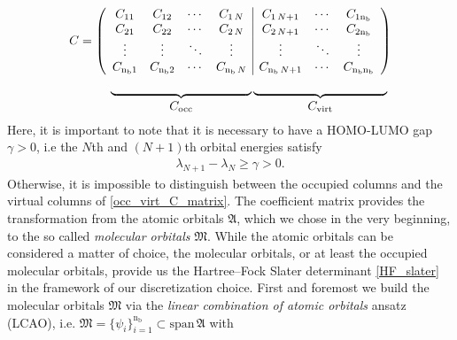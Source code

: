 \documentclass[reqno]{amsart}
\begin{document}
\begin{align}\label{occ_virt_C_matrix}
C = \left(
\begin{array}{cccc|ccc}
C_{11} & C_{12} & \cdots & C_{1\,N} & C_{1\,N+1} & \cdots & C_{1\text{n}_{\text{b}}} \\
C_{21} & C_{22} & \cdots & C_{2\,N} & C_{2\,N+1} & \cdots & C_{2\text{n}_{\text{b}}} \\
\vdots & \vdots & \ddots & \vdots & \vdots & \ddots & \vdots \\
C_{\text{n}_{\text{b}} 1} & C_{\text{n}_{\text{b}} 2} & \cdots & C_{\text{n}_{\text{b}}\,N} & C_{\text{n}_{\text{b}}\,N+1} & \cdots & C_{\text{n}_{\text{b}} \text{n}_{\text{b}}}
\end{array}
\right)
\nonumber \\
\underbrace{\hspace{4cm}}_{\displaystyle C_\mathrm{occ}}
\underbrace{\hspace{3.8cm}}_{\displaystyle C_\mathrm{virt}}\,\,
\end{align}
Here, it is important to note that it is necessary to have a HOMO-LUMO gap $\gamma>0$, i.e the $N$th and $(N+1)$th orbital energies satisfy
\begin{align}
    \lambda_{N+1}-\lambda_N\ge\gamma>0.
\end{align}
Otherwise, it is impossible to distinguish between the occupied columns and the virtual columns of \eqref{occ_virt_C_matrix}. 
The coefficient matrix provides the transformation from the atomic orbitals $\mathfrak{A}$, which we chose in the very beginning, to the so called \textit{molecular orbitals} $\mathfrak{M}$. While the atomic orbitals can be considered a matter of choice, the molecular orbitals, or at least the occupied molecular orbitals, provide us the Hartree–Fock Slater determinant \eqref{HF_slater} in the framework of our discretization choice. First and foremost we build the molecular orbitals $\mathfrak{M}$ via the \textit{linear combination of atomic orbitals} ansatz (LCAO), i.e. $\mathfrak{M}=\lbrace\psi_i\rbrace_{i=1}^{\text{n}_\text{b}}\subset \text{span}\,\mathfrak{A}$ with
\end{document}
